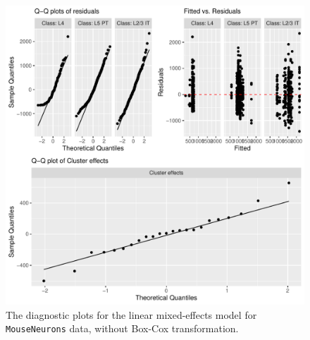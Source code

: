 \begin{figure}[htbp]
\centering 
\includegraphics[width=0.7\linewidth]{diagnosis_model_0.pdf}
\caption{The diagnostic plots for the linear mixed-effects model for \texttt{MouseNeurons} data, without Box-Cox transformation.}
\label{fig:diag-md-0}
\end{figure}

\address{%
Duc-Khanh To\\
University of Padova\\%
Department of Statistical Sciences\\ Via C. Battisti, 241; I-35121
Padova, Italy\\
and \\
Department of Information and Engineering \\
Via Gradenigo, 6/b; 35131 Padova, Italy\\
%
%
\textit{ORCiD: \href{https://orcid.org/0000-0002-4641-0764}{0000-0002-4641-0764}}\\%
\href{mailto:duckhanh.to@unipd.it}{\nolinkurl{duckhanh.to@unipd.it}}%
}

\address{%
Gianfranco Adimari\\
University of Padova\\%
Department of Statistical Sciences\\ Via C. Battisti, 241; I-35121
Padova, Italy\\
%
%
\textit{ORCiD: \href{https://orcid.org/0000-0002-7811-912X}{0000-0002-7811-912X}}\\%
\href{mailto:gianfranco.adimari@unipd.it}{\nolinkurl{gianfranco.adimari@unipd.it}}%
}

\address{%
Monica Chiogna\\
University of Bologna\\%
Department of Statistical Sciences ``Paolo Fortunati'\,'\\ Via Belle
Arti, 41; 40126 Bologna, Italy\\
%
%
\textit{ORCiD: \href{https://orcid.org/0000-0002-7238-3739}{0000-0002-7238-3739}}\\%
\href{mailto:monica.chiogna2@unibo.it}{\nolinkurl{monica.chiogna2@unibo.it}}%
}
